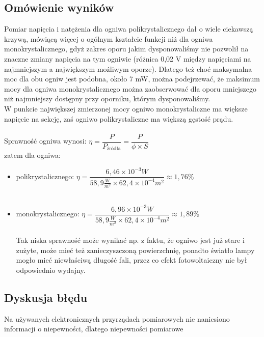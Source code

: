 \documentclass[12pt,a4paper]{article}
\begin{document}
\newpage

\subsection{Omówienie wyników}
Pomiar napięcia i natężenia dla ogniwa polikrystalicznego dał o wiele ciekawszą krzywą, mówiącą więcej o ogólnym kształcie funkcji niż dla ogniwa monokrystalicznego, gdyż zakres oporu jakim dysponowaliśmy nie pozwolił na znaczne zmiany napięcia na tym ogniwie (różnica 0,02 V między napięciami na najmniejszym a największym możliwym oporze). Dlatego też choć maksymalna moc dla obu ogniw jest podobna, około 7 mW, można podejrzewać, że maksimum mocy dla ogniwa monokrystalicznego można zaobserwować dla oporu mniejszego niż najmniejszy dostępny przy oporniku, którym dysponowaliśmy. \\
W punkcie największej zmierzonej mocy ogniwo monokrystaliczne ma większe napięcie na sekcję, zaś ogniwo polikrystaliczne ma większą gęstość prądu.\\\\
Sprawność ogniwa wynosi:
$\eta = \dfrac{P}{P_{\text{źródła}}} = \dfrac{P}{\phi \times S}$ \\
zatem dla ogniwa:\\
\begin{itemize}
\item polikrystalicznego:
$\eta = \dfrac{6,46 \times 10^{-3} W}{58,9 \frac{W}{m^2} \times 62,4 \times 10^{-4} m^2} \approx 1,76 \%$ \\\\
\item monokrystalicznego:
$\eta = \dfrac{6,96 \times 10^{-3} W}{58,9 \frac{W}{m^2} \times 62,4 \times 10^{-4} m^2} \approx 1,89\% $  \\\\
Tak niska sprawność może wynikać np. z faktu, że ogniwo jest już stare i zużyte, może mieć też zanieczyszczoną powierzchnię, ponadto światło lampy mogło mieć niewłaściwą długość fali, przez co efekt fotowoltaiczny nie był odpowiednio wydajny.%
\end{itemize}

\subsection{Dyskusja błędu}
Na używanych elektronicznych przyrządach pomiarowych nie naniesiono informacji o niepewności, dlatego niepewności pomiarowe 
\end{document}
